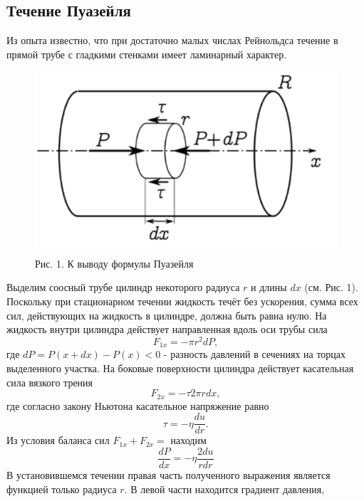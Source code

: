 \documentclass[a4paper]{article}
\begin{document}
\subsection{Течение Пуазейля}
Из опыта известно, что при достаточно малых числах
Рейнольдса течение в прямой трубе с гладкими стенками имеет ламинарный
характер. 
\begin{figure}[h!]
        \centering
        \includegraphics[scale=0.5]{Puaseil.png}
        \caption{
        Рис. 1. К выводу формулы Пуазейля
        }
 \end{figure}
Выделим соосный трубе цилиндр некоторого радиуса $r$ и длины $dx$ (см.
Рис. 1). Поскольку при стационарном течении жидкость течёт без ускорения,
сумма всех сил, действующих на жидкость в цилиндре, должна быть равна
нулю. На жидкость внутри цилиндра действует направленная вдоль оси трубы
сила
\begin{equation*}
	F_{1x} = -\pi r^2dP,
\end{equation*}
где $dP = P(x + dx) - P(x) < 0$ - разность давлений в сечениях на торцах
выделенного участка. На боковые поверхности цилиндра действует касательная сила вязкого трения
\begin{equation*}
	F_{2x} = -\tau 2\pi rdx,
\end{equation*}
где согласно закону Ньютона касательное напряжение равно
\begin{equation*}
	\tau = -\eta \frac{du}{dr}.
\end{equation*}
Из условия баланса сил $F_{1x} + F_{2x} = $ находим
\begin{equation*}
	\frac{dP}{dx} = -\eta \frac{2du}{rdr}
\end{equation*}
В установившемся течении правая часть полученного выражения является
функцией только радиуса $r$. В левой части находится градиент давления,
\end{document}
